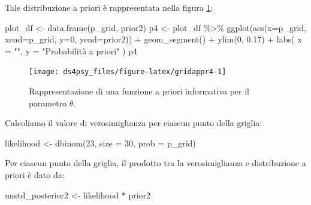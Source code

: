 \documentclass[
  11pt,
]{krantz}
\makeatletter
\newenvironment{Shaded}{\begin{snugshade}}{\end{snugshade}}
\newcommand{\AttributeTok}[1]{\textcolor[rgb]{0.61,0.61,0.61}{#1}}
\newcommand{\DecValTok}[1]{\textcolor[rgb]{0.06,0.06,0.06}{#1}}
\newcommand{\FloatTok}[1]{\textcolor[rgb]{0.06,0.06,0.06}{#1}}
\newcommand{\FunctionTok}[1]{\textcolor[rgb]{0,0,0}{#1}}
\newcommand{\NormalTok}[1]{#1}
\newcommand{\OtherTok}[1]{\textcolor[rgb]{0.37,0.37,0.37}{#1}}
\newcommand{\SpecialCharTok}[1]{\textcolor[rgb]{0,0,0}{#1}}
\newcommand{\StringTok}[1]{\textcolor[rgb]{0.5,0.5,0.5}{#1}}
\newenvironment{kframe}{%
\medskip{}
\setlength{\fboxsep}{.8em}
 \def\at@end@of@kframe{}%
 \ifinner\ifhmode%
  \def\at@end@of@kframe{\end{minipage}}%
  \begin{minipage}{\columnwidth}%
 \fi\fi%
 \def\FrameCommand##1{\hskip\@totalleftmargin \hskip-\fboxsep
 \colorbox{shadecolor}{##1}\hskip-\fboxsep
     \hskip-\linewidth \hskip-\@totalleftmargin \hskip\columnwidth}%
 \MakeFramed {\advance\hsize-\width
   \@totalleftmargin\z@ \linewidth\hsize
   \@setminipage}}%
 {\par\unskip\endMakeFramed%
 \at@end@of@kframe}
\renewenvironment{Shaded}{\begin{kframe}}{\end{kframe}}
\theoremstyle{definition}
\theoremstyle{definition}
\theoremstyle{definition}
\theoremstyle{definition}
\theoremstyle{remark}
\makeatother
\begin{document}
Tale distribuzione a priori è rappresentata nella figura \ref{fig:gridappr4}:

\begin{Shaded}
\begin{Highlighting}[]
\NormalTok{plot\_df }\OtherTok{\textless{}{-}} \FunctionTok{data.frame}\NormalTok{(p\_grid, prior2)}
\NormalTok{p4 }\OtherTok{\textless{}{-}}\NormalTok{ plot\_df }\SpecialCharTok{\%\textgreater{}\%}
  \FunctionTok{ggplot}\NormalTok{(}\FunctionTok{aes}\NormalTok{(}\AttributeTok{x=}\NormalTok{p\_grid, }\AttributeTok{xend=}\NormalTok{p\_grid, }\AttributeTok{y=}\DecValTok{0}\NormalTok{, }\AttributeTok{yend=}\NormalTok{prior2)) }\SpecialCharTok{+}
  \FunctionTok{geom\_segment}\NormalTok{() }\SpecialCharTok{+}
  \FunctionTok{ylim}\NormalTok{(}\DecValTok{0}\NormalTok{, }\FloatTok{0.17}\NormalTok{) }\SpecialCharTok{+}
  \FunctionTok{labs}\NormalTok{(}
    \AttributeTok{x =} \StringTok{""}\NormalTok{,}
    \AttributeTok{y =} \StringTok{"Probabilità a priori"}
\NormalTok{  )}
\NormalTok{p4}
\end{Highlighting}
\end{Shaded}

\begin{figure}[h]

{\centering \texttt{[image: ds4psy\_files/figure-latex/gridappr4-1]} 

}

\caption{Rappresentazione di una funzione a priori informativa per il parametro $\theta$.}\label{fig:gridappr4}
\end{figure}

Calcoliamo il valore di verosimiglianza per ciascun punto della griglia:

\begin{Shaded}
\begin{Highlighting}[]
\NormalTok{likelihood }\OtherTok{\textless{}{-}} \FunctionTok{dbinom}\NormalTok{(}\DecValTok{23}\NormalTok{, }\AttributeTok{size =} \DecValTok{30}\NormalTok{, }\AttributeTok{prob =}\NormalTok{ p\_grid)}
\end{Highlighting}
\end{Shaded}

\noindent Per ciascun punto della griglia, il prodotto tra la verosimiglianza e distribuzione a priori è dato da:

\begin{Shaded}
\begin{Highlighting}[]
\NormalTok{unstd\_posterior2 }\OtherTok{\textless{}{-}}\NormalTok{ likelihood }\SpecialCharTok{*}\NormalTok{ prior2}
\end{Highlighting}
\end{Shaded}
\end{document}

